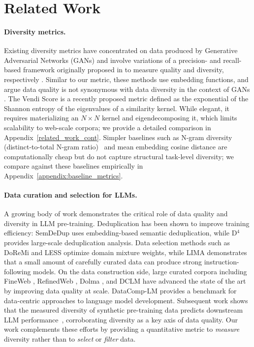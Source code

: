 \section{Related Work}

\paragraph{Diversity metrics.}
Existing diversity metrics have concentrated on data produced by Generative Adversarial Networks (GANs) and involve variations of a precision- and recall-based framework originally proposed in \citep{sajjadi2018assessing} to measure quality and diversity, respectively \citep{kynkaanniemi2019improved, simon2019revisiting, naeem2020}.
Similar to our metric, these methods use embedding functions, and argue data quality is not synonymous with data diversity in the context of GANs \citep{fowl2020random}.
The Vendi Score \citep{friedman2022vendi} is a recently proposed metric defined as the exponential of the Shannon entropy of the eigenvalues of a similarity kernel.
While elegant, it requires materializing an $N\times N$ kernel and eigendecomposing it, which limits scalability to web-scale corpora; we provide a detailed comparison in Appendix~\ref{related_work_cont}.
Simpler baselines such as N-gram diversity (distinct-to-total N-gram ratio)~\citep{li2016diversity} and mean embedding cosine distance are computationally cheap but do not capture structural task-level diversity; we compare against these baselines empirically in Appendix~\ref{appendix:baseline_metrics}.

\paragraph{Data curation and selection for LLMs.}
A growing body of work demonstrates the critical role of data quality and diversity in LLM pre-training.
Deduplication has been shown to improve training efficiency: SemDeDup \citep{abbas2023semdedup, abbas2024effective} uses embedding-based semantic deduplication, while D$^4$ \citep{tirumala2023d4} provides large-scale deduplication analysis.
Data selection methods such as DoReMi \citep{xie2023doremi} and LESS \citep{xia2024less} optimize domain mixture weights, while LIMA \citep{zhou2023lima} demonstrates that a small amount of carefully curated data can produce strong instruction-following models.
On the data construction side, large curated corpora including FineWeb \citep{penedo2024fineweb}, RefinedWeb \citep{penedo2023refinedweb}, Dolma \citep{soldaini2024dolma}, and DCLM \citep{li2024datacomp} have advanced the state of the art by improving data quality at scale.
DataComp-LM \citep{li2024datacomp} provides a benchmark for data-centric approaches to language model development.
Subsequent work shows that the measured diversity of synthetic pre-training data predicts downstream LLM performance~\citep{chen2024diversity}, corroborating diversity as a key axis of data quality.
Our work complements these efforts by providing a quantitative metric to \textit{measure} diversity rather than to \textit{select} or \textit{filter} data.

